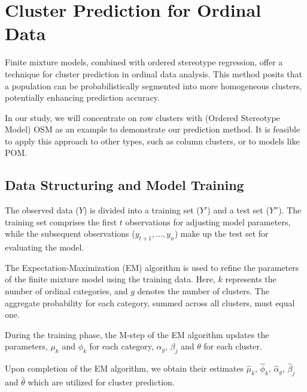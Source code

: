 \documentclass{article}
\begin{document}




\section{Cluster Prediction for Ordinal Data}

Finite mixture models, combined with ordered stereotype regression, offer a technique for cluster prediction in ordinal data analysis. This method posits that a population can be probabilistically segmented into more homogeneous clusters, potentially enhancing prediction accuracy.

In our study, we will concentrate on row clusters with (Ordered Stereotype Model) OSM as an example to demonstrate our prediction method. It is feasible to apply this approach to other types, such as column clusters, or to models like POM.

\subsection{Data Structuring and Model Training}

The observed data ($Y$) is divided into a training set ($Y'$) and a test set ($Y''$). The training set comprises the first $t$ observations for adjusting model parameters, while the subsequent observations ($y_{t+1}, \dots, y_n$) make up the test set for evaluating the model.

The Expectation-Maximization (EM) algorithm is used to refine the parameters of the finite mixture model using the training data. 
Here, $k$ represents the number of ordinal categories, and $g$ denotes the number of clusters. 
The aggregate probability for each category, summed across all clusters, must equal one.

During the training phase, the M-step of the EM algorithm updates the parameters, 
$\mu_k$ and $\phi_k$ for each category, $\alpha_g$, $\beta_j$ and $\theta$ for each cluster.

Upon completion of the EM algorithm, we obtain their estimates $\hat{\mu}_k$, $\hat{\phi}_k$, $\hat{\alpha}_g$, $\hat{\beta}_j$ and $\hat{\theta}$ which are utilized for cluster prediction.
\end{document}
